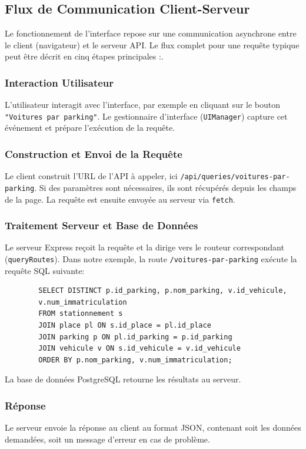 \documentclass[a4paper,12pt]{report}
\begin{document}
\subsection{Flux de Communication Client-Serveur}

Le fonctionnement de l'interface repose sur une communication asynchrone entre le client (navigateur) et le serveur API. Le flux complet pour une requête typique peut être décrit en cinq étapes principales :.

\subsubsection{Interaction Utilisateur}
L'utilisateur interagit avec l'interface, par exemple en cliquant sur le bouton \texttt{"Voitures par parking"}. Le gestionnaire d’interface (\texttt{UIManager}) capture cet événement et prépare l’exécution de la requête.


\subsubsection{Construction et Envoi de la Requête}
Le client construit l’URL de l’API à appeler, ici \texttt{/api/queries/voitures-par-parking}. Si des paramètres sont nécessaires, ils sont récupérés depuis les champs de la page. La requête est ensuite envoyée au serveur via \texttt{fetch}.

\subsubsection{Traitement Serveur et Base de Données}
Le serveur Express reçoit la requête et la dirige vers le routeur correspondant (\texttt{queryRoutes}). Dans notre exemple, la route \texttt{/voitures-par-parking} exécute la requête SQL suivante:

\begin{verbatim}
        SELECT DISTINCT p.id_parking, p.nom_parking, v.id_vehicule, 
        v.num_immatriculation
        FROM stationnement s
        JOIN place pl ON s.id_place = pl.id_place
        JOIN parking p ON pl.id_parking = p.id_parking
        JOIN vehicule v ON s.id_vehicule = v.id_vehicule
        ORDER BY p.nom_parking, v.num_immatriculation;
\end{verbatim}

La base de données PostgreSQL retourne les résultats au serveur.
\subsubsection{Réponse}
Le serveur envoie la réponse au client au format JSON, contenant soit les données demandées, soit un message d’erreur en cas de problème.
\end{document}

